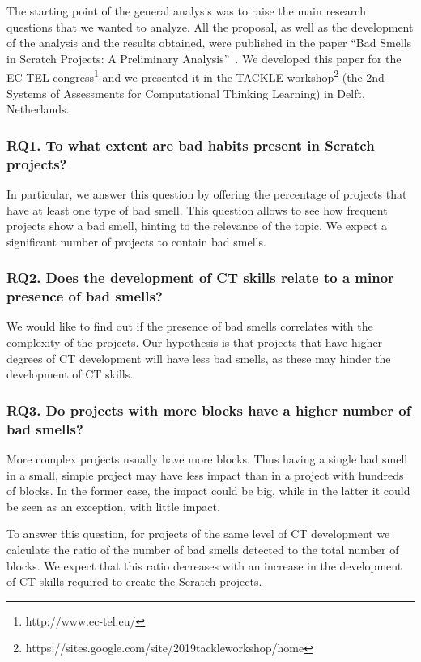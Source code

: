 The starting point of the general analysis was to raise the main research questions that we wanted to analyze. All the proposal, as well as the development of the analysis and the results obtained, were published in the paper ``Bad Smells in Scratch Projects: A Preliminary Analysis''~\cite{vargas2019bad}. We developed this paper for the EC-TEL congress\footnote{http://www.ec-tel.eu/} and we presented it in the TACKLE workshop\footnote{https://sites.google.com/site/2019tackleworkshop/home} (the 2nd Systems of Assessments for Computational Thinking Learning) in Delft, Netherlands.

\subsubsection{RQ1. To what extent are bad habits present in Scratch projects?}
\label{subsubsec:RQ1}

In particular, we answer this question by offering the percentage of projects that have at least one type of bad smell. This question allows to see how frequent projects show a bad smell, hinting to the relevance of the topic. We expect a significant number of projects to contain bad smells.

\subsubsection{RQ2. Does the development of CT skills relate to a minor presence of bad smells?}
\label{subsubsec:RQ2}

We would like to find out if the presence of bad smells correlates with the complexity of the projects. Our hypothesis is that projects that have higher degrees of CT development will have less bad smells, as these may hinder the development of CT skills.

\subsubsection{RQ3. Do projects with more blocks have a higher number of bad smells?}
\label{subsubsec:RQ3}

More complex projects usually have more blocks. Thus having a single bad smell in a small, simple project may have less impact than in a project with hundreds of blocks. In the former case, the impact could be big, while in the latter it could be seen as an exception, with little impact.

To answer this question, for projects of the same level of CT development we calculate the ratio of the number of bad smells detected to the total number of blocks. We expect that this ratio decreases with an increase in the development of CT skills required to create the Scratch projects.

